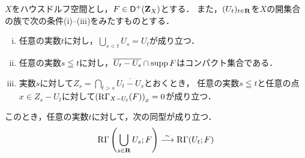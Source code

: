 \begin{leftbar}    
\begin{PRP}
    \(X\)をハウスドルフ空間とし，\(F\in\mathsf{D}^+(\mathbf{Z}_X)\)とする．
    また，\((U_t)_{t\in\mathbf{R}}\)を\(X\)の開集合の族で次の条件(i)--(iii)をみたすものとする．
    \begin{enumerate}[(i)]
        \item 任意の実数\(t\)に対し，\(\bigcup_{s<t}U_s=U_t\)が成り立つ．
        \item 任意の実数\(s\leqq t\)に対し，\(\overline{U_t-U_s}\cap\mathop{\mathrm{supp}}\nolimits F\)はコンパクト集合である．
        \item 実数\(s\)に対して\(Z_s=\bigcap_{t>s}\overline{U_t-U_s}\)とおくとき，
        任意の実数\(s\leqq t\)と任意の点\(x\in Z_s-U_t\)に対して\(\left(\mathop{\mathrm{R}\hspace{-0pt}\Gamma}\nolimits_{X-U_t}(F)\right)_x=0\)が成り立つ．
    \end{enumerate}
    このとき，任意の実数\(t\)に対して，次の同型が成り立つ．
    \[
        \mathop{\mathrm{R}\hspace{-0pt}\Gamma}\nolimits\left(\bigcup_{s\in\mathbf{R}}U_s;F\right)\overset{\sim}{\longrightarrow}\mathop{\mathrm{R}\hspace{-0pt}\Gamma}\nolimits(U_t;F)
    \]
\end{PRP}
\end{leftbar}
